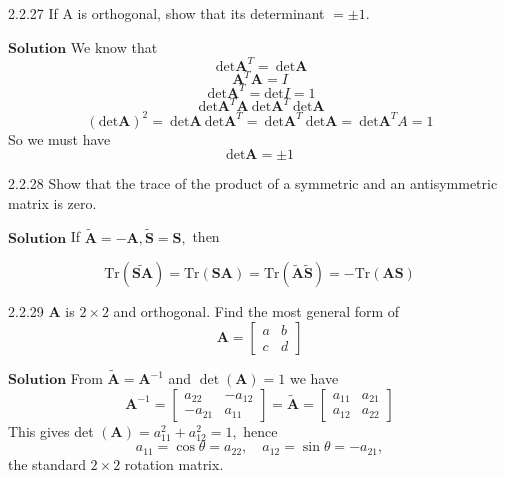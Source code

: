 \documentclass{styles/kaobook}
\begin{document}
\begin{greenbox}{2.2.27}
If A is orthogonal, show that its determinant $=\pm 1 .$
\end{greenbox}



$\boxed{\textbf{Solution}}$ We know that
$$\ \text{det} \mathbf{A}^T = \ \text{det} \mathbf{A}$$
$$\mathbf{A}^T\mathbf{A}=I$$
$$\ \text{det} \mathbf{A}^T = \text{det}I = 1$$
$$\ \text{det} \mathbf{A}^T\mathbf{A} \ \text{det} \mathbf{A}^T \ \text{det} \mathbf{A}$$
$$(\text{det} \mathbf{A})^2 = \ \text{det} \mathbf{A} \ \text{det} \mathbf{A}^T = \ \text{det} \mathbf{A}^T \ \text{det} \mathbf{A} = \ \text{det} \mathbf{A}^TA = 1$$
So we must have
$$\text{det}\mathbf{A} = \pm 1$$



















\begin{greenbox}{2.2.28}
Show that the trace of the product of a symmetric and an antisymmetric matrix is zero.
\end{greenbox}


$\boxed{\textbf{Solution}}$  
If $\tilde{\mathbf{A}}=-\mathbf{A}, \tilde{\mathbf{S}}=\mathbf{S},$ then

$$\text{Tr}(\widetilde{\mathbf{SA}})=\text{Tr}(\mathbf{SA})=\text{Tr}(\tilde{\mathbf{A}} \tilde{\mathbf{S}})=-\text{Tr}(\mathbf{AS})$$





\begin{greenbox}{2.2.29}
$\mathbf{A}$ is $2 \times 2$ and orthogonal. Find the most general form of
$$
\mathbf{A}=\begin{bmatrix}{a} & {b} \\ {c} & {d}\end{bmatrix}
$$
\end{greenbox}

$\boxed{\textbf{Solution}}$  From $\tilde{\mathbf{A}}=\mathbf{A}^{-1}$ and $\operatorname{det}(\mathbf{A})=1$ we have
$$
\mathbf{A}^{-1}=\begin{bmatrix}{a_{22}} & {-a_{12}} \\ {-a_{21}} & {a_{11}}\end{bmatrix}=\tilde{\mathbf{A}}=\begin{bmatrix}{a_{11}} & {a_{21}} \\ {a_{12}} & {a_{22}}\end{bmatrix}
$$
This gives det $(\mathbf{A})=a_{11}^{2}+a_{12}^{2}=1,$ hence 
$$a_{11}=\cos \theta=a_{22},\quad  a_{12}=\sin \theta=-a_{21},$$
the standard $2 \times 2$ rotation matrix.
\end{document}

